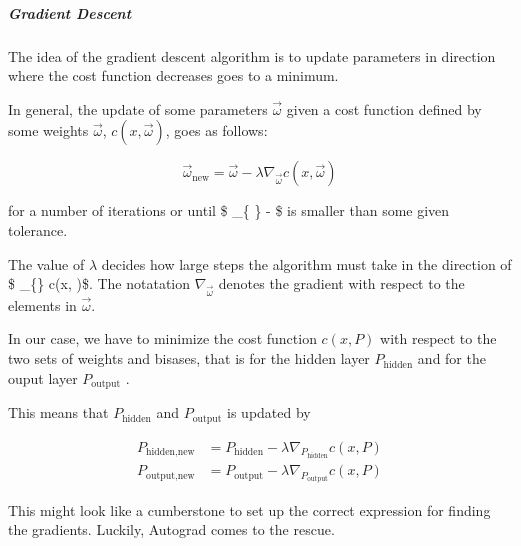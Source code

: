 \documentclass[11pt]{article}
\begin{document}
    \hypertarget{gradient-descent}{%
\subparagraph{Gradient Descent}\label{gradient-descent}}

The idea of the gradient descent algorithm is to update parameters in
direction where the cost function decreases goes to a minimum.

In general, the update of some parameters \(\vec \omega\) given a cost
function defined by some weights \(\vec \omega\), \(c(x, \vec \omega)\),
goes as follows:

\[
\vec \omega_{\text{new} } = \vec \omega - \lambda \nabla_{\vec \omega} c(x, \vec \omega)
\]

for a number of iterations or until \$ \big\textbar{}\big\textbar{}
\vec \omega\_\{ \} -
\vec \omega \big\textbar{}\big\textbar{}\$ is smaller than some given
tolerance.

The value of \(\lambda\) decides how large steps the algorithm must take
in the direction of \$ \nabla\_\{\vec \omega\} c(x, \vec \omega)\$. The
notatation \(\nabla_{\vec \omega}\) denotes the gradient with respect to
the elements in \(\vec \omega\).

In our case, we have to minimize the cost function \(c(x, P)\) with
respect to the two sets of weights and bisases, that is for the hidden
layer \(P_{\text{hidden} }\) and for the ouput layer
\(P_{\text{output} }\) .

This means that \(P_{\text{hidden} }\) and \(P_{\text{output} }\) is
updated by

\[
\begin{aligned}
P_{\text{hidden},\text{new}} &= P_{\text{hidden}} - \lambda \nabla_{P_{\text{hidden}}} c(x, P)  \\
P_{\text{output},\text{new}} &= P_{\text{output}} - \lambda \nabla_{P_{\text{output}}} c(x, P)  
\end{aligned}
\]

This might look like a cumberstone to set up the correct expression for
finding the gradients. Luckily, Autograd comes to the rescue.
\end{document}
